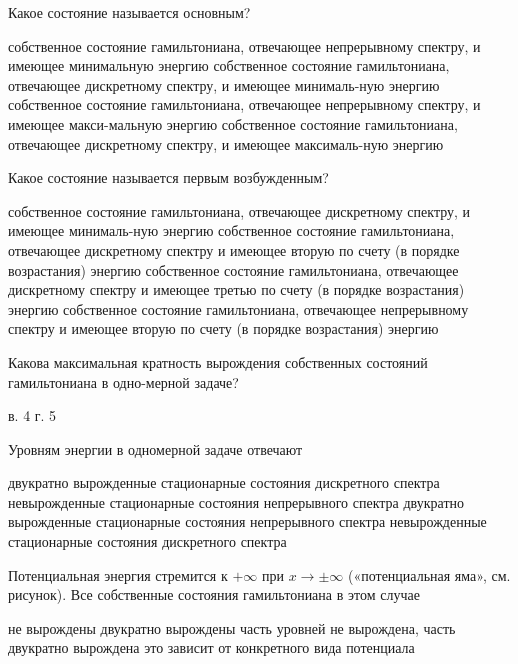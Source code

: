 \documentclass[11pt,a4paper]{exam}
\begin{document}
\begin{questions}
\question Какое состояние называется основным?
\begin{choices}
\choice собственное состояние гамильтониана, отвечающее непрерывному спектру, и имеющее минимальную энергию   
\choice собственное состояние гамильтониана, отвечающее дискретному спектру, и имеющее минималь-ную энергию
\choice собственное состояние гамильтониана, отвечающее непрерывному спектру, и имеющее макси-мальную энергию
\choice собственное состояние гамильтониана, отвечающее дискретному спектру, и имеющее максималь-ную энергию
\end{choices}

\question Какое состояние называется первым возбужденным?
\begin{choices}
\choice собственное состояние гамильтониана, отвечающее дискретному спектру, и имеющее минималь-ную энергию
\choice собственное состояние гамильтониана, отвечающее дискретному спектру и имеющее вторую по счету (в порядке возрастания) энергию 
\choice собственное состояние гамильтониана, отвечающее дискретному спектру и имеющее третью по счету (в порядке возрастания) энергию 
\choice собственное состояние гамильтониана, отвечающее непрерывному спектру и имеющее вторую по счету (в порядке возрастания) энергию
\end{choices}

\question Какова максимальная кратность вырождения собственных состояний гамильтониана в одно-мерной задаче?
\begin{choices}
     в. 4     г. 5
\end{choices}

\question Уровням энергии в одномерной задаче отвечают
\begin{choices}
\choice двукратно вырожденные стационарные состояния дискретного спектра
\choice невырожденные стационарные состояния непрерывного спектра
\choice двукратно вырожденные стационарные состояния непрерывного спектра
\choice невырожденные стационарные состояния дискретного спектра 
\end{choices}

\question Потенциальная энергия стремится к $ + \infty $ при $x \to  \pm \infty $ («потенциальная яма», см. рисунок). Все собственные состояния гамильтониана в этом случае 
\begin{choices}
\choice не вырождены
\choice двукратно вырождены 
\choice часть уровней не вырождена, часть двукратно вырождена 
\choice это зависит от конкретного вида потенциала
\end{choices}


\end{questions}
\end{document}
